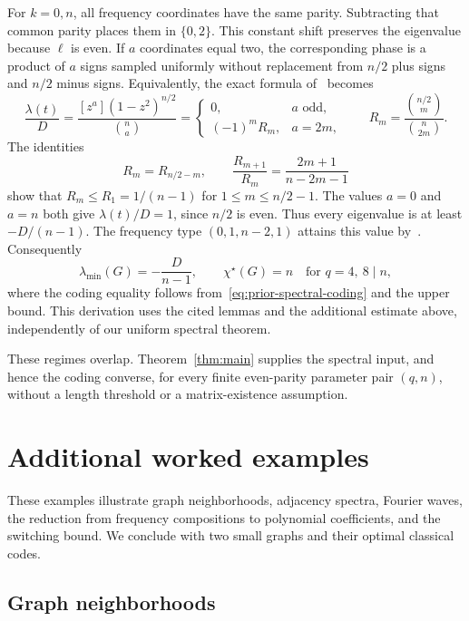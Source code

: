 \documentclass[11pt,a4paper]{article}
\numberwithin{equation}{section}
\numberwithin{figure}{section}
\numberwithin{table}{section}
\numberwithin{footnote}{section}
\theoremstyle{informal}\newtheorem*{informaltheorem}{Informal theorem}
\theoremstyle{definition}\newtheorem{example}{Example}[section]
\theoremstyle{remark}\newtheorem{remark}[theorem]{Remark}
\newcommand{\chs}{\chi^{\star}}
\begin{document}
For \(k=0,n\), all frequency coordinates have the same parity.
Subtracting that common parity places them in \(\{0,2\}\).
This constant shift preserves the eigenvalue because \(\ell\) is even.
If \(a\) coordinates equal two, the corresponding phase is a
product of \(a\) signs sampled uniformly without replacement from
\(n/2\) plus signs and \(n/2\) minus signs. Equivalently, the exact formula
of~\cite[Lemma~4.6]{nkz} becomes
\begin{equation}
 \frac{\lambda(t)}D
 =\frac{[z^a](1-z^2)^{n/2}}{\binom na}
 =\begin{cases}
    0,&a\text{ odd},\\
    (-1)^m R_m,&a=2m,
   \end{cases}
 \qquad
 R_m=\frac{\binom{n/2}{m}}{\binom n{2m}}.
\end{equation}
The identities
\begin{equation}
 R_m=R_{n/2-m},\qquad
 \frac{R_{m+1}}{R_m}=\frac{2m+1}{n-2m-1}
\end{equation}
show that \(R_m\leq R_1=1/(n-1)\) for
\(1\leq m\leq n/2-1\). The values \(a=0\) and \(a=n\) both
give \(\lambda(t)/D=1\), since \(n/2\) is even.
Thus every eigenvalue is at least \(-D/(n-1)\).
The frequency type \((0,1,n-2,1)\) attains this value
by~\cite[Lemma~4.5]{nkz}. Consequently
\begin{equation}
 \lambda_{\min}(G)=-\frac D{n-1},\qquad \chs(G)=n
 \quad\text{for }q=4,\ 8\mid n,
\end{equation}
where the coding equality follows
from~\eqref{eq:prior-spectral-coding} and the upper bound.
This derivation uses the cited lemmas and the additional estimate
above, independently of our uniform spectral theorem.

These regimes overlap. Theorem~\ref{thm:main} supplies the spectral
input, and hence the coding converse, for every finite even-parity
parameter pair \((q,n)\), without a length threshold or a
matrix-existence assumption.

\section{Additional worked examples}\label{app:examples}
These examples illustrate graph neighborhoods, adjacency spectra,
Fourier waves, the reduction from frequency compositions to
polynomial coefficients, and the switching bound. We conclude with
two small graphs and their optimal classical codes.

\subsection{Graph neighborhoods}
\label{app:example-neighborhoods}
\end{document}
